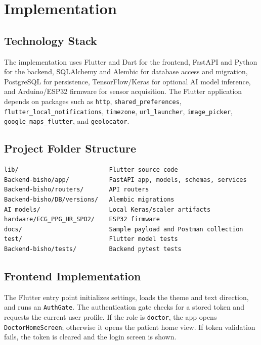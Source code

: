 \chapter{Implementation}

\section{Technology Stack}

The implementation uses Flutter and Dart for the frontend, FastAPI and Python for the backend, SQLAlchemy and Alembic for database access and migration, PostgreSQL for persistence, TensorFlow/Keras for optional AI model inference, and Arduino/ESP32 firmware for sensor acquisition. The Flutter application depends on packages such as \texttt{http}, \texttt{shared\_preferences}, \texttt{flutter\_local\_notifications}, \texttt{timezone}, \texttt{url\_launcher}, \texttt{image\_picker}, \texttt{google\_maps\_flutter}, and \texttt{geolocator}.

\section{Project Folder Structure}

\begin{lstlisting}[caption={Main repository structure}]
lib/                         Flutter source code
Backend-bisho/app/           FastAPI app, models, schemas, services
Backend-bisho/routers/       API routers
Backend-bisho/DB/versions/   Alembic migrations
AI models/                   Local Keras/scaler artifacts
hardware/ECG_PPG_HR_SPO2/    ESP32 firmware
docs/                        Sample payload and Postman collection
test/                        Flutter model tests
Backend-bisho/tests/         Backend pytest tests
\end{lstlisting}

\section{Frontend Implementation}

The Flutter entry point initializes settings, loads the theme and text direction, and runs an \texttt{AuthGate}. The authentication gate checks for a stored token and requests the current user profile. If the role is \texttt{doctor}, the app opens \texttt{DoctorHomeScreen}; otherwise it opens the patient home view. If token validation fails, the token is cleared and the login screen is shown.

